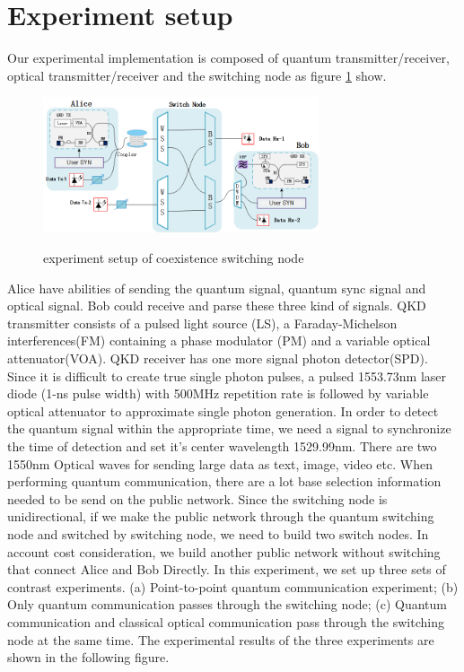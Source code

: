\documentclass[letterpaper,10pt]{article}
\begin{document}
\section{Experiment setup}
Our experimental implementation is composed of quantum transmitter/receiver, optical transmitter/receiver and the switching node as figure \ref{Fig:experiment_of_switching_node} show.
\begin{figure}
 \centering
 \includegraphics[height= 4cm,width=.8\linewidth]{experiment_of_switching_node}
 \label{Fig:experiment_of_switching_node}
 \caption{experiment setup of coexistence switching node}
\end{figure}
Alice have abilities of sending the quantum signal, quantum sync signal and optical signal. Bob could receive and parse these three kind of signals. QKD transmitter consists of a pulsed light source (LS), a Faraday-Michelson interferences(FM) containing a phase modulator (PM) and a variable optical attenuator(VOA). QKD receiver has one more signal photon detector(SPD). Since it is difficult to create true single photon pulses, a pulsed 1553.73nm laser diode (1-ns pulse width) with 500MHz repetition rate is followed by variable optical attenuator to approximate single photon generation. In order to detect the quantum signal within the appropriate time, we need a signal to synchronize the time of detection and set it's center wavelength 1529.99nm. There are two 1550nm Optical waves for sending large data as text, image, video etc. When performing quantum communication, there are a lot base selection information needed to be send on the public network. Since the switching node is unidirectional, if we make the public network through the quantum switching node and switched by switching node, we need to build two switch nodes. In account cost consideration, we build another public network without switching  that connect Alice and Bob Directly. In this experiment, we set up three sets of contrast experiments. (a) Point-to-point quantum communication experiment; (b) Only quantum communication passes through the switching node; (c) Quantum communication and classical optical communication pass through the switching node at the same time. The experimental results of the three experiments are shown in the following figure.
\end{document}
